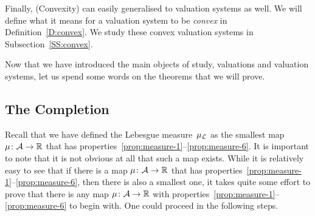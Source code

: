 \documentclass[main.tex]{subfiles}
\begin{document}
Finally,
(Convexity)
can easily generalised to valuation systems as well.
We will define what it means
for a valuation system to be \emph{convex}
in  Definition~\ref{D:convex}.
We study these convex valuation systems in Subsection~\ref{SS:convex}.

\vspace{1em}
\noindent
Now that we have introduced
the main objects of study,
valuations and valuation systems,
let us spend some words on the theorems that we will prove.


\subsection{The Completion}
Recall that we have defined
the Lebesgue measure~$\mu_{\mathcal{L}}$
as the smallest map $\mu\colon \mathcal{A}\rightarrow \mathbb{R}$
that has properties~\ref{prop:measure-1}--\ref{prop:measure-6}.
It is important to note that
it is not obvious at all that such a map exists.
While it is relatively easy to see
that if there is a map $\mu\colon \mathcal{A} \rightarrow \mathbb{R}$
that has properties~\ref{prop:measure-1}--\ref{prop:measure-6},
then there is also a smallest one,
it takes quite some effort
to prove that there is any map $\mu\colon \mathcal{A}\rightarrow \mathbb{R}$
with properties~\ref{prop:measure-1}--\ref{prop:measure-6} to begin with.
One could proceed in the following steps.
\end{document}
